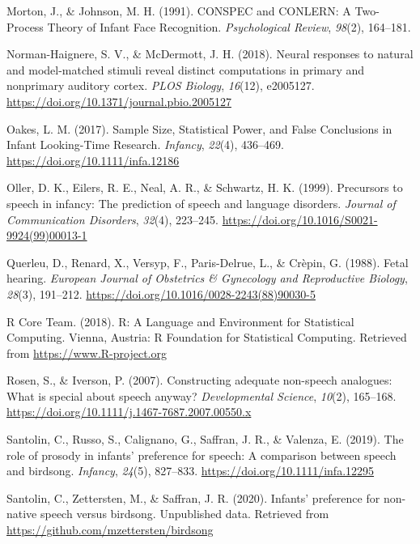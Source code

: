 \documentclass[
  english,
  man]{apa6}
\begin{document}
\leavevmode\hypertarget{ref-morton_conspec_1991}{}%
Morton, J., \& Johnson, M. H. (1991). CONSPEC and CONLERN: A Two-Process Theory of Infant Face Recognition. \emph{Psychological Review}, \emph{98}(2), 164--181.

\leavevmode\hypertarget{ref-norman-haignere_neural_2018}{}%
Norman-Haignere, S. V., \& McDermott, J. H. (2018). Neural responses to natural and model-matched stimuli reveal distinct computations in primary and nonprimary auditory cortex. \emph{PLOS Biology}, \emph{16}(12), e2005127. \url{https://doi.org/10.1371/journal.pbio.2005127}

\leavevmode\hypertarget{ref-oakes_sample_2017}{}%
Oakes, L. M. (2017). Sample Size, Statistical Power, and False Conclusions in Infant Looking-Time Research. \emph{Infancy}, \emph{22}(4), 436--469. \url{https://doi.org/10.1111/infa.12186}

\leavevmode\hypertarget{ref-oller_precursors_1999}{}%
Oller, D. K., Eilers, R. E., Neal, A. R., \& Schwartz, H. K. (1999). Precursors to speech in infancy: The prediction of speech and language disorders. \emph{Journal of Communication Disorders}, \emph{32}(4), 223--245. \url{https://doi.org/10.1016/S0021-9924(99)00013-1}

\leavevmode\hypertarget{ref-querleu_fetal_1988}{}%
Querleu, D., Renard, X., Versyp, F., Paris-Delrue, L., \& Crèpin, G. (1988). Fetal hearing. \emph{European Journal of Obstetrics \& Gynecology and Reproductive Biology}, \emph{28}(3), 191--212. \url{https://doi.org/10.1016/0028-2243(88)90030-5}

\leavevmode\hypertarget{ref-r_core_team_r:_2018}{}%
R Core Team. (2018). R: A Language and Environment for Statistical Computing. Vienna, Austria: R Foundation for Statistical Computing. Retrieved from \url{https://www.R-project.org}

\leavevmode\hypertarget{ref-rosen_constructing_2007}{}%
Rosen, S., \& Iverson, P. (2007). Constructing adequate non-speech analogues: What is special about speech anyway? \emph{Developmental Science}, \emph{10}(2), 165--168. \url{https://doi.org/10.1111/j.1467-7687.2007.00550.x}

\leavevmode\hypertarget{ref-santolin_role_2019}{}%
Santolin, C., Russo, S., Calignano, G., Saffran, J. R., \& Valenza, E. (2019). The role of prosody in infants' preference for speech: A comparison between speech and birdsong. \emph{Infancy}, \emph{24}(5), 827--833. \url{https://doi.org/10.1111/infa.12295}

\leavevmode\hypertarget{ref-santolin_infants_2020}{}%
Santolin, C., Zettersten, M., \& Saffran, J. R. (2020). Infants' preference for non-native speech versus birdsong. Unpublished data. Retrieved from \url{https://github.com/mzettersten/birdsong}
\end{document}
